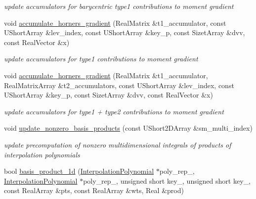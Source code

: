 \begin{DoxyCompactItemize}
\begin{DoxyCompactList}\small\item\em update accumulators for barycentric type1 contributions to moment gradient \end{DoxyCompactList}\item 
void \hyperlink{classPecos_1_1SharedNodalInterpPolyApproxData_aab4bedf76f70118596f59ed58005af0d}{accumulate\+\_\+horners\+\_\+gradient} (Real\+Matrix \&t1\+\_\+accumulator, const U\+Short\+Array \&lev\+\_\+index, const U\+Short\+Array \&key\+\_\+p, const Sizet\+Array \&dvv, const Real\+Vector \&x)\label{classPecos_1_1SharedNodalInterpPolyApproxData_aab4bedf76f70118596f59ed58005af0d}

\begin{DoxyCompactList}\small\item\em update accumulators for type1 contributions to moment gradient \end{DoxyCompactList}\item 
void \hyperlink{classPecos_1_1SharedNodalInterpPolyApproxData_ab77b63c4f0f0d2cb9c0e22ae786d4c62}{accumulate\+\_\+horners\+\_\+gradient} (Real\+Matrix \&t1\+\_\+accumulator, Real\+Matrix\+Array \&t2\+\_\+accumulators, const U\+Short\+Array \&lev\+\_\+index, const U\+Short\+Array \&key\+\_\+p, const Sizet\+Array \&dvv, const Real\+Vector \&x)\label{classPecos_1_1SharedNodalInterpPolyApproxData_ab77b63c4f0f0d2cb9c0e22ae786d4c62}

\begin{DoxyCompactList}\small\item\em update accumulators for type1 + type2 contributions to moment gradient \end{DoxyCompactList}\item 
void \hyperlink{classPecos_1_1SharedNodalInterpPolyApproxData_a7d47dcaaf6ef3a82c495a7364e891b20}{update\+\_\+nonzero\+\_\+basis\+\_\+products} (const U\+Short2\+D\+Array \&sm\+\_\+multi\+\_\+index)
\begin{DoxyCompactList}\small\item\em update precomputation of nonzero multidimensional integrals of products of interpolation polynomials \end{DoxyCompactList}\item 
bool \hyperlink{classPecos_1_1SharedNodalInterpPolyApproxData_a843bf3984d474092d66ecd59bd7ac30f}{basis\+\_\+product\+\_\+1d} (\hyperlink{classPecos_1_1InterpolationPolynomial}{Interpolation\+Polynomial} $\ast$poly\+\_\+rep\+\_, \hyperlink{classPecos_1_1InterpolationPolynomial}{Interpolation\+Polynomial} $\ast$poly\+\_\+rep\+\_, unsigned short key\+\_, unsigned short key\+\_, const Real\+Array \&pts, const Real\+Array \&wts, Real \&prod)\label{classPecos_1_1SharedNodalInterpPolyApproxData_a843bf3984d474092d66ecd59bd7ac30f}


\end{DoxyCompactItemize}
